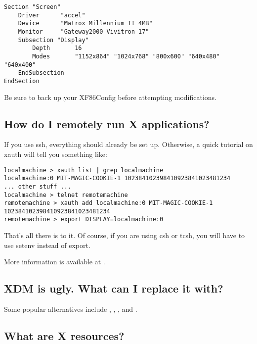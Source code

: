 \documentclass[a4paper]{article}
\begin{document}
\begin{tscreen}
\begin{verbatim}
Section "Screen"
    Driver      "accel"
    Device      "Matrox Millennium II 4MB"
    Monitor     "Gateway2000 Vivitron 17"
    Subsection "Display"
        Depth       16
        Modes       "1152x864" "1024x768" "800x600" "640x480" "640x400"
    EndSubsection
EndSection
\end{verbatim}
\end{tscreen}


Be sure to back up your XF86Config before attempting modifications.




\subsection{How do I remotely run X applications?}

If you use ssh, everything should already be set up.  Otherwise, a quick 
tutorial on xauth will tell you something like:

\begin{tscreen}
\begin{verbatim}
localmachine > xauth list | grep localmachine
localmachine:0 MIT-MAGIC-COOKIE-1 102384102398410923841023481234
... other stuff ...
localmachine > telnet remotemachine
remotemachine > xauth add localmachine:0 MIT-MAGIC-COOKIE-1 102384102398410923841023481234
remotemachine > export DISPLAY=localmachine:0
\end{verbatim}
\end{tscreen}


That's all there is to it.  Of course, if you are using csh or tcsh, you
will have to use setenv instead of export.

More information is available at .




\subsection{XDM is ugly.  What can I replace it with?}

Some popular alternatives include
,
,
,
and .




\subsection{What are X resources?}
\end{document}
